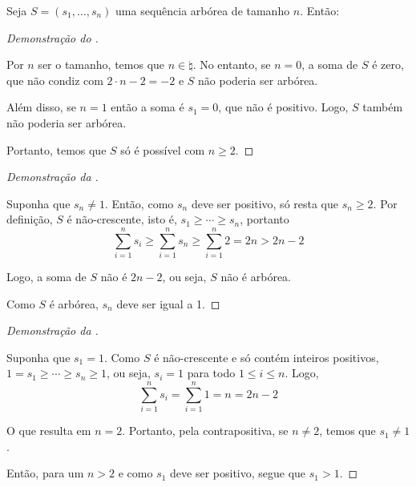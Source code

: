 \begin{proposition}
    Seja $S = (s_1, \ldots, s_n)$ uma sequência arbórea de tamanho $n$. Então:

\end{proposition}

\begin{proof}[Demonstração do ]~

    Por $n$ ser o tamanho, temos que $n \in \natural$. No entanto, se $n = 0$, a soma de $S$ é zero, que não condiz com $2 \cdot n - 2 = -2$ e $S$ não poderia ser arbórea.

    Além disso, se $n = 1$ então a soma é $s_1 = 0$, que não é positivo. Logo, $S$ também não poderia ser arbórea.

    Portanto, temos que $S$ só é possível com $n \geq 2$.
\end{proof}

\begin{proof}[Demonstração da ]~

    Suponha que $s_n \ne 1$. Então, como $s_n$ deve ser positivo, só resta que $s_n \geq 2$. Por definição, $S$ é não-crescente, isto é, $s_1 \geq \cdots \geq s_n$, portanto
    \[
        \sum_{i = 1}^n s_i \geq \sum_{i = 1}^n s_n \geq \sum_{i = 1}^n 2 = 2 n > 2 n - 2
    \]

    Logo, a soma de $S$ não é $2n - 2$, ou seja, $S$ não é arbórea.

    Como $S$ é arbórea, $s_n$ deve ser igual a 1.
\end{proof}

\begin{proof}[Demonstração da ]~

    Suponha que $s_1 = 1$. Como $S$ é não-crescente e só contém inteiros positivos, $1 = s_1 \geq \cdots \geq s_n \geq 1$, ou seja, $s_i = 1$ para todo $1 \leq i \leq n$. Logo,
    \[
        \sum_{i = 1}^n s_i = \sum_{i = 1}^n 1 = n = 2n - 2
    \]

    O que resulta em $n = 2$. Portanto, pela contrapositiva, se $n \ne 2$, temos que $s_1 \ne 1$.

    Então, para um $n > 2$ e como $s_1$ deve ser positivo, segue que $s_1 > 1$.
\end{proof}
